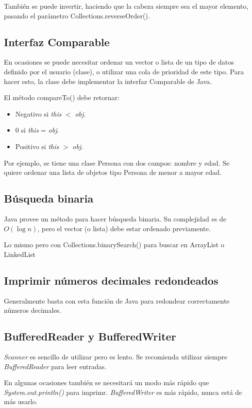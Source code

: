 \documentclass{article}
\begin{document}
\begin{multicols}{2}
	También se puede invertir, haciendo que la cabeza siempre sea el mayor elemento, pasando el parámetro Collections.reverseOrder().
	
	
	\subsection{Interfaz Comparable}
	En ocasiones se puede necesitar ordenar un vector o lista de un tipo de datos definido por el usuario (clase), o utilizar una cola de prioridad de este tipo. Para hacer esto, la clase debe implementar la interfaz Comparable de Java.

	El método compareTo() debe retornar:
	\begin{itemize}
		\item Negativo si \emph{this} \( < \) \emph{obj}.
		\item 0 si \emph{this} = \emph{obj}.
		\item Positivo si \emph{this} \( > \) \emph{obj}.
	\end{itemize}	
	
	Por ejemplo, se tiene una clase Persona con dos campos: nombre y edad. Se quiere ordenar una lista de objetos tipo Persona de menor a mayor edad.
	
	
	\subsection{Búsqueda binaria}
	Java provee un método para hacer búsqueda binaria. Su complejidad es de \( O( \log n ) \), pero el vector (o lista) debe estar ordenado previamente.
	
	
	
	Lo mismo pero con Collections.binarySearch() para buscar en ArrayList o LinkedList
	
	\subsection{Imprimir números decimales redondeados}
	Generalmente basta con esta función de Java para redondear correctamente números decimales.	
	
	
	\subsection{BufferedReader y BufferedWriter}
	\emph{Scanner} es sencillo de utilizar pero es lento. Se recomienda utilizar siempre \emph{BufferedReader} para leer entradas.
	
	En algunas ocasiones también se necesitará un modo más rápido que \emph{System.out.println()} para imprimr. \emph{BufferedWriter} es más rápido, nunca está de más usarlo.
	

\end{multicols}	
\end{document}
